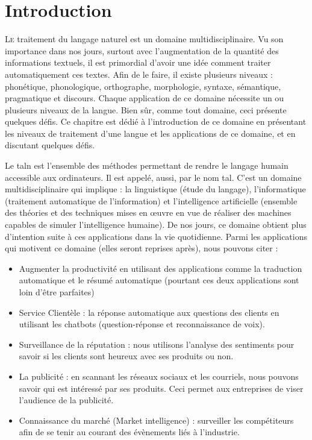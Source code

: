 \documentclass{KodeBook}
\begin{document}
		\mainmatter
	
\fi
\chapter{Introduction}

\begin{introduction}
	\lettrine{L}{e} traitement du langage naturel est un domaine multidisciplinaire. 
	Vu son importance dans nos jours, surtout avec l'augmentation de la quantité des informations textuels, il est primordial d'avoir une idée comment traiter automatiquement ces textes. 
	Afin de le faire, il existe plusieurs niveaux : phonétique, phonologique, orthographe, morphologie, syntaxe, sémantique, pragmatique et discours. 
	Chaque application de ce domaine nécessite un ou plusieurs niveaux de la langue. 
	Bien sûr, comme tout domaine, ceci présente quelques défis. 
	Ce chapitre est dédié à l'introduction de ce domaine en présentant les niveaux de traitement d'une langue et les applications de ce domaine, et en discutant quelques défis.
\end{introduction} 

Le \ac{taln} est l'ensemble des méthodes permettant de rendre le langage humain accessible aux ordinateurs.
Il est appelé, aussi, par le nom \ac{tal}. 
C'est un domaine multidisciplinaire qui implique : la linguistique (étude du langage), l'informatique (traitement automatique de l'information) et l'intelligence artificielle (ensemble des théories et des techniques mises en œuvre en vue de réaliser des machines capables de simuler l'intelligence humaine).
De nos jours, ce domaine obtient plus d'intention suite à ces applications dans la vie quotidienne. 
Parmi les applications qui motivent ce domaine (elles seront reprises après), nous pouvons citer :
\begin{itemize}
	\item Augmenter la productivité en utilisant des applications comme la traduction automatique et le résumé automatique (pourtant ces deux applications sont loin d'être parfaites)
	
	\item Service Clientèle : la réponse automatique aux questions des clients en utilisant les chatbots (question-réponse et reconnaissance de voix). 
	
	\item Surveillance de la réputation : nous utilisons l'analyse des sentiments pour savoir si les clients sont heureux avec ses produits ou non. 
	
	\item La publicité : en scannant les réseaux sociaux et les courriels, nous pouvons savoir qui est intéressé par ses produits. Ceci permet aux entreprises de viser l'audience de la publicité. 
	
	\item Connaissance du marché (Market intelligence) : surveiller les compétiteurs afin de se tenir au courant des évènements liés à l'industrie.
\end{itemize}
\end{document}
